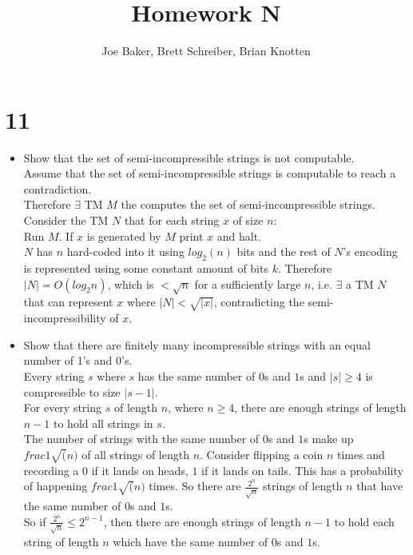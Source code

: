 \documentclass[letterpaper,notitlepage,twoside]{article}
\newcommand\tab[1][1cm]{\hspace*{#1}} %
\begin{document}
\title{Homework N}
\author{Joe Baker, Brett Schreiber, Brian Knotten}
\maketitle

\section*{11}
\begin{itemize}

\item Show that the set of semi-incompressible strings is not computable. \\
Assume that the set of semi-incompressible strings is computable to reach a contradiction. \\
Therefore $\exists$ TM $M$ the computes the set of semi-incompressible strings. \\
Consider the TM $N$ that for each string $x$ of size $n$: \\
\tab Run $M$. If $x$ is generated by $M$ print $x$ and halt. \\
$N$ has $n$ hard-coded into it using $log_{2} (n)$ bits and the rest of $N$'s encoding is represented using some constant amount of bits $k$. Therefore $|N| = O(log_{2} n)$, which is $< \sqrt{n}$ for a sufficiently large $n$, i.e. $\exists$ a TM $N$ that can represent $x$ where $|N| < \sqrt{|x|}$, contradicting the semi-incompressibility of $x$.\\

\item Show that there are finitely many incompressible strings with an equal number of 1's and 0's. \\
Every string $s$ where $s$ has the same number of $0$s and $1$s and $|s| \geq 4$ is compressible to size $|s - 1|$.\\
For every string $s$ of length $n$, where $n \geq 4$, there are enough strings of length $n - 1$ to hold all strings in $s$.\\
The number of strings with the same number of $0$s and $1$s make up $frac{1}{\sqrt(n)}$ of all strings of length $n$.
Consider flipping a coin $n$ times and recording a $0$ if it lands on heads, $1$ if it lands on tails. This has a probability of happening $frac{1}{\sqrt(n)}$ times.
So there are $\frac{2^n}{\sqrt{n}}$ strings of length $n$ that have the same number of $0$s and $1$s.\\

So if $\frac{2^n}{\sqrt{n}} \leq 2^{n - 1}$, then there are enough strings of length $n - 1$ to hold each string of length $n$ which have the same number of $0$s and $1$s.\\


\end{itemize}
\end{document}
